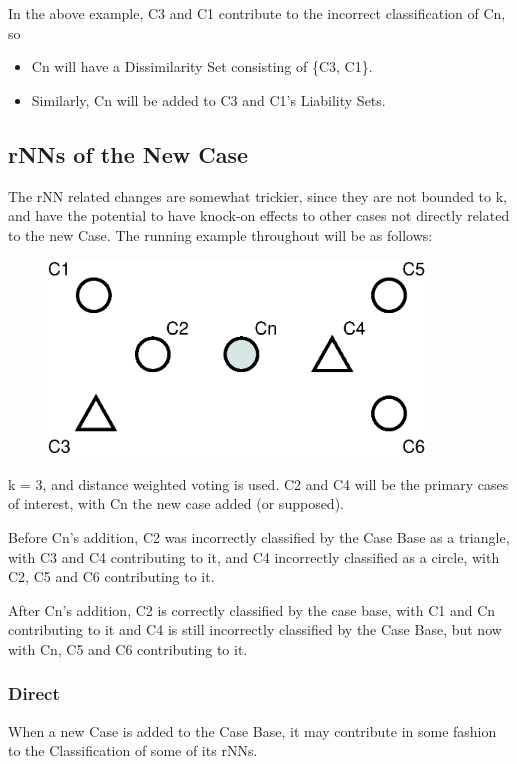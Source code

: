 \documentclass[a4paper,11pt]{report}
\begin{document}
In the above example, C3 and C1 contribute to the incorrect classification of Cn, so
\begin{itemize}
	\item Cn will have a Dissimilarity Set consisting of \{C3, C1\}.
	\item Similarly, Cn will be added to C3 and C1's Liability Sets.
\end{itemize}

\subsection{rNNs of the New Case}
The rNN related changes are somewhat trickier, since they are not bounded to k, and have the potential to have knock-on effects to other cases not directly related to the new Case.
The running example throughout will be as follows:

\begin{figure}[h!]
\includegraphics[width=10cm]{./Drawn/rNNExample}
\end{figure}

k = 3, and distance weighted voting is used. C2 and C4 will be the primary cases of interest, with Cn the new case added (or supposed).

Before Cn's addition, C2 was incorrectly classified by the Case Base as a triangle, with C3 and C4 contributing to it, and C4 incorrectly classified as a circle, with C2, C5 and C6 contributing to it.

After Cn's addition, C2 is correctly classified by the case base, with C1 and Cn contributing to it and C4 is still incorrectly classified by the Case Base, but now with Cn, C5 and C6 contributing to it.

\subsubsection{Direct}
When a new Case is added to the Case Base, it may contribute in some fashion to the Classification of some of its rNNs.
\end{document}
